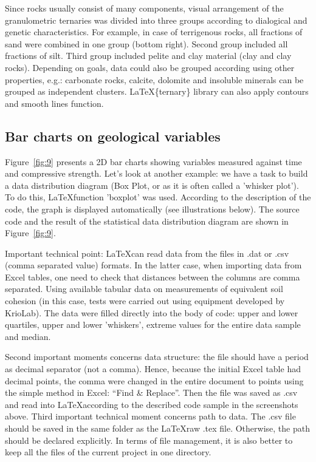 \documentclass[a4paper,10pt]{article}
\begin{document}
Since rocks usually consist of many components, visual arrangement of the granulometric ternaries was divided into three groups according to dialogical and genetic characteristics. For example, in case of terrigenous rocks, all fractions of sand were combined in one group (bottom right). Second group included all fractions of silt. Third group included pelite and clay material (clay and clay rocks). Depending on goals, data could also be grouped according using other properties, e.g.: carbonate rocks, calcite, dolomite and insoluble minerals can be grouped as independent clusters. \LaTeX \space \{ternary\} library can also apply contours and smooth lines function.

\subsection{Bar charts on geological variables}

Figure~\ref{fig:9} presents a 2D bar charts showing variables measured against time and compressive strength.
Let's look at another example: we have a task to build a data distribution diagram (Box Plot, or as it is often called a 'whisker plot').
To do this, \LaTeX \space function 'boxplot' was used. According to the description of the code, the graph is displayed automatically (see illustrations below). The source code and the result of the statistical data distribution diagram are shown in Figure~\ref{fig:9}. 

Important technical point: \LaTeX \space can read data from the files in .dat or .csv (comma separated value) formats. In the latter case, when importing data from Excel tables, one need to check that distances between the columns are comma separated. Using available tabular data on measurements of equivalent soil cohesion (in this case, tests were carried out using equipment developed by KrioLab). The data were filled directly into the body of code: upper and lower quartiles, upper and lower 'whiskers', extreme values for the entire data sample and median.

Second important moments concerns data structure: the file should have a period as decimal separator (not a comma). Hence, because the initial Excel table had decimal points,  the comma were changed in the entire document to points using the simple method in Excel: “Find \& Replace”. Then the file was saved as .csv and read into \LaTeX \space according to the described code sample in the screenshots above. Third important technical moment concerns path to data. The .csv file should be saved in the same folder as the \LaTeX\space raw .tex file. Otherwise, the path should be declared explicitly. In terms of file management, it is also better to keep all the files of the current project in one directory.
\end{document}
